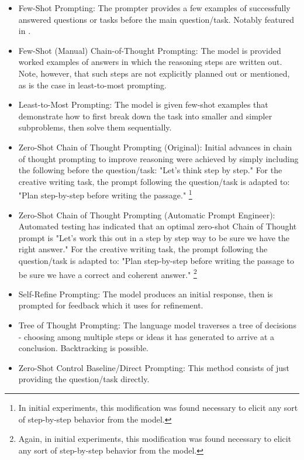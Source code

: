 \documentclass[11pt]{article}
\begin{document}
\begin{itemize}
  \item Few-Shot Prompting: The prompter provides a few examples of successfully answered questions or tasks before the main question/task. Notably featured in \citealp{brown_language_2020}.
  \item Few-Shot (Manual) Chain-of-Thought Prompting: The model is provided worked examples of answers in which the reasoning steps are written out. \cite{wei_chain--thought_nodate} Note, however, that such steps are not explicitly planned out or mentioned, as is the case in least-to-most prompting.
  \item Least-to-Most Prompting: The model is given few-shot examples that demonstrate how to first break down the task into smaller and simpler subproblems, then solve them sequentially. \cite{zhou_least--most_2023}
  \item Zero-Shot Chain of Thought Prompting (Original): Initial advances in chain of thought prompting to improve reasoning were achieved by simply including the following before the question/task: "Let's think step by step." \cite{kojima_large_2023} For the creative writing task, the prompt following the question/task is adapted to: "Plan step-by-step before writing the passage." \footnote{In initial experiments, this modification was found necessary to elicit any sort of step-by-step behavior from the model.}
  \item Zero-Shot Chain of Thought Prompting (Automatic Prompt Engineer): Automated testing has indicated that an optimal zero-shot Chain of Thought prompt is "Let's work this out in a step by step way to be sure we have the right answer." \cite{zhou_large_2022} For the creative writing task, the prompt following the question/task is adapted to: "Plan step-by-step before writing the passage to be sure we have a correct and coherent answer." \footnote{Again, in initial experiments, this modification was found necessary to elicit any sort of step-by-step behavior from the model.}
  \item Self-Refine Prompting: The model produces an initial response, then is prompted for feedback which it uses for refinement. \cite{madaan_Self-Refine_2023}
  \item Tree of Thought Prompting: The language model traverses a tree of decisions - choosing among multiple steps or ideas it has generated to arrive at a conclusion. Backtracking is possible. \cite{yao_tree_2023}
  \item Zero-Shot Control Baseline/Direct Prompting: This method consists of just providing the question/task directly.
\end{itemize}
\end{document}
